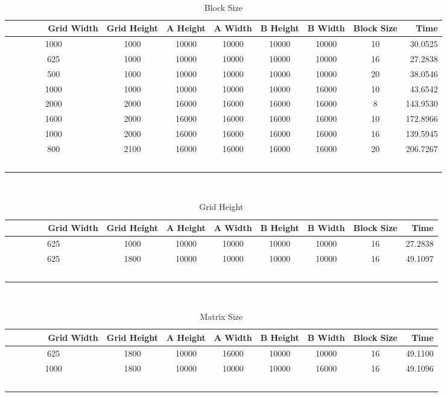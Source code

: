 \documentclass[8pt]{article}
\begin{document}
\begin{table}[hp]
\caption {Block Size} \label{tab:title}
    \begin{tabular}{|c|c|c|c|c|c|c|r|}\hline
        Grid Width & Grid Height & A Height & A Width & B Height & B Width & Block Size & Time \\ \hline	
	1000 & 1000 & 10000 & 10000 & 10000 & 10000 & 10 & 30.0525\\ \hline
	625 & 1000 & 10000 & 10000 & 10000 & 10000 & 16 & 27.2838\\ \hline
	500 & 1000 & 10000 & 10000 & 10000 & 10000 & 20 & 38.0546\\ \hline
	1000 & 1000 & 10000 & 10000 & 10000 & 16000 & 10 & 43.6542\\ \hline
	2000 & 2000 & 16000 & 16000 & 16000 & 16000 & 8 & 143.9530\\ \hline
	1600 & 2000 & 16000 & 16000 & 16000 & 16000 & 10 & 172.8966\\ \hline
	1000 & 2000 & 16000 & 16000 & 16000 & 16000 & 16 & 139.5945\\ \hline
	800 & 2100 & 16000 & 16000 & 16000 & 16000 & 20 & 206.7267 \\ \hline
    \end{tabular}
\end{table}


\begin{table}[hp]
\caption {Grid Height} \label{tab:title}
    \begin{tabular}{|c|c|c|c|c|c|c|r|}\hline
        Grid Width & Grid Height & A Height & A Width & B Height & B Width & Block Size & Time \\ \hline
	625 & 1000 & 10000 & 10000 & 10000 & 10000 & 16 & 27.2838\\ \hline
	625 & 1800 & 10000 & 10000 & 10000 & 10000 & 16 & 49.1097\\ \hline
    \end{tabular}
\end{table}

\begin{table}[hp]
\caption {Matrix Size} \label{tab:title}
    \begin{tabular}{|c|c|c|c|c|c|c|r|}\hline
        Grid Width & Grid Height & A Height & A Width & B Height & B Width & Block Size & Time \\ \hline
	625 & 1800 & 10000 & 16000 & 10000 & 10000 & 16 & 49.1100\\ \hline
	1000 & 1800 & 10000 & 10000 & 10000 & 16000 & 16 & 49.1096\\ \hline
    \end{tabular}
\end{table}
\end{document}
